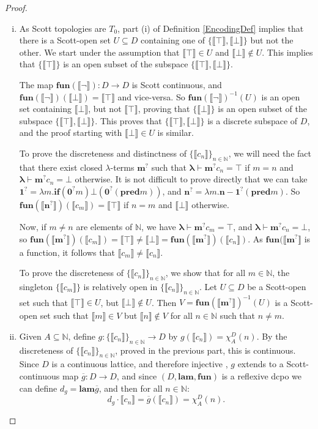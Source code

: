 \documentclass{lmcs}
\newcommand{\sembrack}[1]{\llbracket{#1}\rrbracket}
\newcommand{\N}{\ensuremath{\mathbb{N}}}
\newcommand{\Zero}{\mathcal{Z}}
\newcommand{\If}{\mathbf{if}}
\renewcommand{\Zero}{\mathbf{0}^?}
\newcommand{\Num}[1]{\mathbf{#1}^?}
\newcommand{\pred}{\mathbf{pred}}
\newcommand{\lamth}{\boldsymbol{\lambda}} %
\newcommand{\fun}{\mathbf{fun}}
\newcommand{\lam}{\mathbf{lam}}
\begin{document}
\begin{proof}
\begin{enumerate}[(i)]
\item As Scott topologies are $T_0$, part (i) of Definition \ref{EncodingDef} implies that there is a Scott-open set $U \subseteq D$ containing one of $\{ \sembrack{\top}, \sembrack{\bot} \}$ but not the other. We start under the assumption that $\sembrack{\top} \in U$ and $\sembrack{\bot} \not\in U$. This implies that $\{\sembrack{\top}\}$ is an open subset of the subspace $\{\sembrack{\top},\sembrack{\bot}\}$.
		
The map $\fun(\sembrack{\lnot}) : D \rightarrow D$ is Scott continuous, and $\fun(\sembrack{\lnot})(\sembrack{\bot}) = \sembrack{\top}$ and vice-versa. So $\fun(\sembrack{\lnot})^{-1}(U)$ is an open set containing $\sembrack{\bot}$, but not $\sembrack{\top}$, proving that $\{\sembrack{\bot}\}$ is an open subset of the subspace $\{\sembrack{\top},\sembrack{\bot}\}$. This proves that $\{\sembrack{\top},\sembrack{\bot}\}$ is a discrete subspace of $D$, and the proof starting with $\sembrack{\bot} \in U$ is similar.
		
To prove the discreteness and distinctness of $\{\sembrack{c_n}\}_{n \in \N}$, we will need the fact that there exist closed $\lambda$-terms $\Num{m}$ such that $\lamth \vdash \Num{m} c_n = \top$ if $m = n$ and $\lamth \vdash \Num{m} c_n = \bot$ otherwise. It is not difficult to prove directly that we can take $\Num{1} = \lambda m. \If (\Zero m) \bot (\Zero (\pred m))$, and $\Num{n} = \lambda m. \Num{n-1} (\pred m)$. So $\fun(\sembrack{\Num{n}})(\sembrack{c_m}) = \sembrack{\top}$ if $n = m$ and $\sembrack{\bot}$ otherwise. 
		
Now, if $m \neq n$ are elements of $\N$, we have $\lamth \vdash \Num{m} c_m = \top$, and $\lamth \vdash \Num{m} c_n = \bot$, so $\fun(\sembrack{\Num{m}})(\sembrack{c_m}) = \sembrack{\top} \neq \sembrack{\bot} = \fun(\sembrack{\Num{m}})(\sembrack{c_n})$. As $\fun(\sembrack{\Num{m}}$ is a function, it follows that $\sembrack{c_m} \neq \sembrack{c_n}$. 
		
To prove the discreteness of $\{\sembrack{c_n}\}_{n \in \N}$, we show that for all $m \in \N$, the singleton $\{\sembrack{c_m}\}$ is relatively open in $\{\sembrack{c_n}\}_{n \in \N}$. Let $U \subseteq D$ be a Scott-open set such that $\sembrack{\top} \in U$, but $\sembrack{\bot} \not\in U$. Then $V = \fun(\sembrack{\Num{m}})^{-1}(U)$ is a Scott-open set such that $\sembrack{m} \in V$ but $\sembrack{n} \not\in V$ for all $n \in \N$ such that $n \neq m$. 
\item Given $A \subseteq \N$, define $g : \{ \sembrack{c_n} \}_{n \in \N} \rightarrow D$ by $g(\sembrack{c_n}) = \chi^D_A(n)$. By the discreteness of $\{\sembrack{c_n}\}_{n \in \N}$, proved in the previous part, this is continuous. Since $D$ is a continuous lattice, and therefore injective \cite[Theorem 2.12]{scott72}, $g$ extends to a Scott-continuous map $\overline{g} : D \rightarrow D$, and since $(D,\lam,\fun)$ is a reflexive dcpo we can define $d_g = \lam \overline{g}$, and then for all $n \in \N$:
\[
d_g \cdot \sembrack{c_n} = \overline{g}(\sembrack{c_n}) = \chi^D_A(n).
\]
\end{enumerate}
\end{proof}
\end{document}
